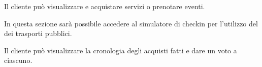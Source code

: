 \begin{center}
\end{center}
\begin{center}
\end{center}
Il cliente può visualizzare e acquistare servizi o prenotare eventi.
\begin{center}
\end{center}
In questa sezione sarà possibile accedere al simulatore di checkin per l'utilizzo del dei trasporti pubblici.
\begin{center}
\end{center}
Il cliente può visualizzare la cronologia degli acquisti fatti e dare un voto a ciascuno.

